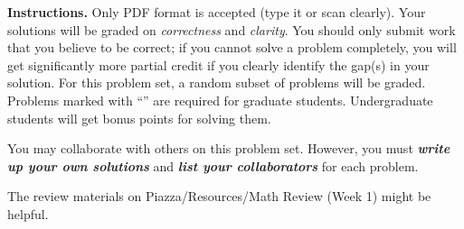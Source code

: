 \ifstudent
{}%
\else
{}%
\fi

\noindent \textbf{Instructions.} Only PDF format is accepted (type it or scan
clearly). Your solutions will be graded on \emph{correctness} and
\emph{clarity}. You should only submit work that you believe to be
correct; if you cannot solve a problem completely, you will get
significantly more partial credit if you clearly identify the gap(s)
in your solution. For this problem set, a random subset of problems
will be graded. Problems marked with ``\mG'' are required for graduate
students. Undergraduate students will get bonus points for solving
them.  \medskip

\noindent You may collaborate with others on this problem set. 
However, you must \textbf{\emph{write up your own solutions}} and
\textbf{\emph{list your collaborators}} for each problem.

\medskip

\noindent The review materials on Piazza/Resources/Math Review (Week
1) might be helpful.

